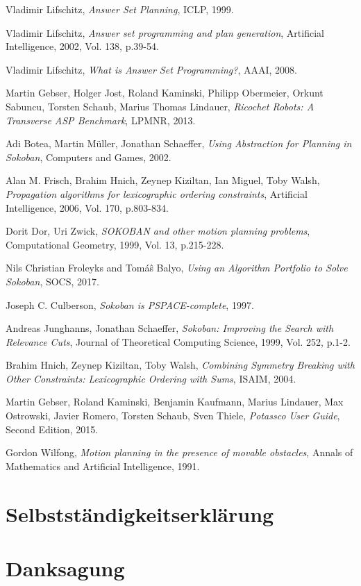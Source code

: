 \documentclass[12pt,a4paper,oneside]{report}
\begin{document}
\begin{thebibliography}{}
Vladimir Lifschitz,
\textit{Answer Set Planning},
ICLP, 1999.

Vladimir Lifschitz,
\textit{Answer set programming and plan generation},
Artificial Intelligence, 2002, Vol. 138, p.39-54.

Vladimir Lifschitz,
\textit{What is Answer Set Programming?},
AAAI, 2008.

Martin Gebser, Holger Jost, Roland Kaminski, Philipp Obermeier, Orkunt Sabuncu, Torsten Schaub, Marius Thomas Lindauer,
\textit{Ricochet Robots: A Transverse ASP Benchmark},
LPMNR, 2013.

Adi Botea, Martin Müller, Jonathan Schaeffer,
\textit{Using Abstraction for Planning in Sokoban},
Computers and Games, 2002.

Alan M. Frisch, Brahim Hnich, Zeynep Kiziltan, Ian Miguel, Toby Walsh,
\textit{Propagation algorithms for lexicographic ordering constraints},
Artificial Intelligence, 2006, Vol. 170, p.803-834.

Dorit Dor, Uri Zwick,
\textit{SOKOBAN and other motion planning problems},
Computational Geometry, 1999, Vol. 13, p.215-228.

Nils Christian Froleyks and Tom{\'a}{\^s} Balyo,
\textit{Using an Algorithm Portfolio to Solve Sokoban},
SOCS, 2017.

Joseph C. Culberson,
\textit{Sokoban is PSPACE-complete},
1997.

Andreas Junghanns, Jonathan Schaeffer,
\textit{Sokoban: Improving the Search with Relevance Cuts},
Journal of Theoretical Computing Science, 1999, Vol. 252, p.1-2.

Brahim Hnich, Zeynep Kiziltan, Toby Walsh,
\textit{Combining Symmetry Breaking with Other Constraints: Lexicographic Ordering with Sums},
ISAIM, 2004.

Martin Gebser, Roland Kaminski, Benjamin Kaufmann, Marius Lindauer, Max Ostrowski, Javier Romero, Torsten Schaub, Sven Thiele,
\textit{Potassco User Guide},
Second Edition, 2015.

Gordon Wilfong,
\textit{Motion planning in the presence of movable obstacles},
Annals of Mathematics and Artificial Intelligence, 1991.
\end{thebibliography}

\newpage
\chapter*{Selbstständigkeitserklärung}
\newpage
\chapter*{Danksagung}
\end{document}
